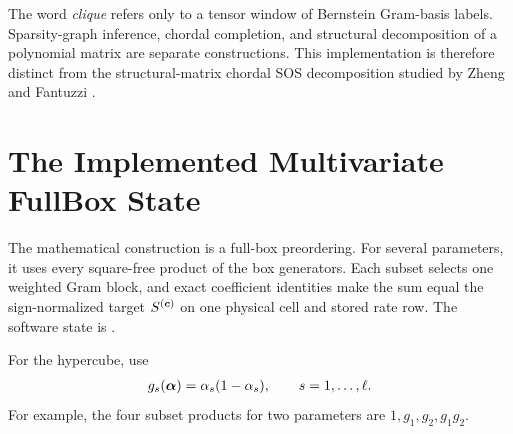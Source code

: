 The word \emph{clique} refers only to a tensor window of Bernstein Gram-basis labels. Sparsity-graph inference, chordal completion, and structural decomposition of a polynomial matrix are separate constructions. This implementation is therefore distinct from the structural-matrix chordal SOS decomposition studied by Zheng and Fantuzzi \cite{zhengfantuzzi2023}.

\section{The Implemented Multivariate FullBox State}
\label{sec:certificate-full-box}

The mathematical construction is a full-box preordering. For several parameters, it uses every square-free product of the box generators. Each subset selects one weighted Gram block, and exact coefficient identities make the sum equal the sign-normalized target $S^{(\boldsymbol{c})}$ on one physical cell and stored rate row. The software state is .

For the hypercube, use
\begin{gather*}
  g_s(\boldsymbol{\alpha})=\alpha_s(1-\alpha_s),
  \qquad s=1,\ldots,\ell.
\end{gather*}
For example, the four subset products for two parameters are $1,g_1,g_2,g_1g_2$.

\begin{center}
\end{center}

